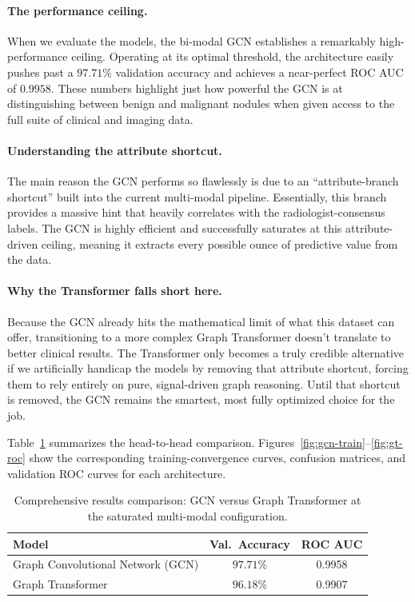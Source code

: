 \documentclass[10pt,letterpaper,twocolumn]{article}
\begin{document}
\paragraph{The performance ceiling.} When we evaluate the models, the bi-modal GCN establishes a remarkably high-performance ceiling. Operating at its optimal threshold, the architecture easily pushes past a $97.71\%$ validation accuracy and achieves a near-perfect ROC AUC of $0.9958$. These numbers highlight just how powerful the GCN is at distinguishing between benign and malignant nodules when given access to the full suite of clinical and imaging data.

\paragraph{Understanding the attribute shortcut.} The main reason the GCN performs so flawlessly is due to an ``attribute-branch shortcut'' built into the current multi-modal pipeline. Essentially, this branch provides a massive hint that heavily correlates with the radiologist-consensus labels. The GCN is highly efficient and successfully saturates at this attribute-driven ceiling, meaning it extracts every possible ounce of predictive value from the data.

\paragraph{Why the Transformer falls short here.} Because the GCN already hits the mathematical limit of what this dataset can offer, transitioning to a more complex Graph Transformer doesn't translate to better clinical results. The Transformer only becomes a truly credible alternative if we artificially handicap the models by removing that attribute shortcut, forcing them to rely entirely on pure, signal-driven graph reasoning. Until that shortcut is removed, the GCN remains the smartest, most fully optimized choice for the job.

Table~\ref{tab:gcn-vs-gt} summarizes the head-to-head comparison. Figures~\ref{fig:gcn-train}--\ref{fig:gt-roc} show the corresponding training-convergence curves, confusion matrices, and validation ROC curves for each architecture.

\begin{table}[t]
\centering
\caption{Comprehensive results comparison: GCN versus Graph Transformer at the saturated multi-modal configuration.}
\label{tab:gcn-vs-gt}
\small
\begin{tabular}{lcc}
\toprule
Model & Val.\ Accuracy & ROC AUC \\
\midrule
Graph Convolutional Network (GCN) & $97.71\%$ & 0.9958 \\
Graph Transformer                  & $96.18\%$ & 0.9907 \\
\bottomrule
\end{tabular}
\end{table}
\end{document}
